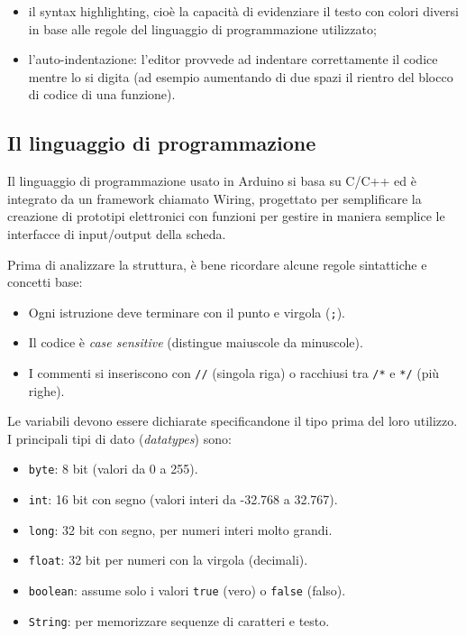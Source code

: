 \documentclass[12pt, letterpaper]{book}
\begin{document}
\begin{itemize}[leftmargin=1.2cm, itemsep=1pt, topsep=5pt]
          \begin{itemize}[leftmargin=1.2cm, itemsep=1pt, topsep=5pt]
            \item il syntax highlighting, cioè la capacità di evidenziare il testo con colori diversi in base alle regole del linguaggio di programmazione utilizzato;
            \item l'auto-indentazione: l'editor provvede ad indentare correttamente il codice mentre lo si digita (ad esempio aumentando di due spazi il rientro del blocco di codice di una funzione).
          \end{itemize}
  \end{itemize}

    \subsection{Il linguaggio di programmazione}

    Il linguaggio di programmazione usato in Arduino si basa su C/C++ ed è integrato da un framework chiamato Wiring, progettato per semplificare la creazione di prototipi elettronici con funzioni per gestire in maniera semplice le interfacce di input/output della scheda.
    
    Prima di analizzare la struttura, è bene ricordare alcune regole sintattiche e concetti base:
    \begin{itemize}[leftmargin=1.2cm, itemsep=1pt, topsep=5pt]
      \item Ogni istruzione deve terminare con il punto e virgola (\texttt{;}).
      \item Il codice è \textit{case sensitive} (distingue maiuscole da minuscole).
      \item I commenti si inseriscono con \texttt{//} (singola riga) o racchiusi tra \texttt{/*} e \texttt{*/} (più righe).
    \end{itemize}

    Le variabili devono essere dichiarate specificandone il tipo prima del loro utilizzo. I principali tipi di dato (\textit{datatypes}) sono:
    \begin{itemize}[leftmargin=1.2cm, itemsep=1pt, topsep=5pt]
      \item \texttt{byte}: 8 bit (valori da 0 a 255).
      \item \texttt{int}: 16 bit con segno (valori interi da -32.768 a 32.767).
      \item \texttt{long}: 32 bit con segno, per numeri interi molto grandi.
      \item \texttt{float}: 32 bit per numeri con la virgola (decimali).
      \item \texttt{boolean}: assume solo i valori \texttt{true} (vero) o \texttt{false} (falso).
      \item \texttt{String}: per memorizzare sequenze di caratteri e testo.
    \end{itemize}
\end{document}
